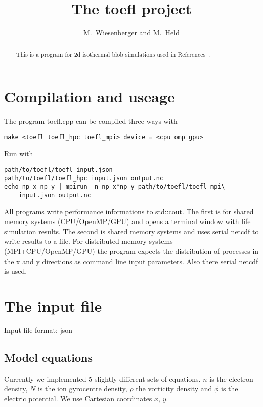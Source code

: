 


\usepackage{minted}
\renewcommand{\ne}{\ensuremath{{n_e} }}
\renewcommand{\ni}{\ensuremath{{N_i} }}



\title{The toefl project}
\author{ M.~Wiesenberger and M.~Held}
\maketitle

\begin{abstract}
  This is a program for 2d isothermal blob simulations used in References~\cite{Wiesenberger2014,Kube2016,Wiesenberger2017a}.
\end{abstract}
\tableofcontents

\section{Compilation and useage}
The program toefl.cpp can be compiled three ways with
\begin{verbatim}
make <toefl toefl_hpc toefl_mpi> device = <cpu omp gpu>
\end{verbatim}
Run with
\begin{verbatim}
path/to/toefl/toefl input.json
path/to/toefl/toefl_hpc input.json output.nc
echo np_x np_y | mpirun -n np_x*np_y path/to/toefl/toefl_mpi\
    input.json output.nc
\end{verbatim}
All programs write performance informations to std::cout.
The first is for shared memory systems (CPU/OpenMP/GPU) and opens a terminal window with life simulation results.
 The
second is shared memory systems and uses serial netcdf
to write results to a file.
For distributed
memory systems (MPI+CPU/OpenMP/GPU) the program expects the distribution of processes in the
x and y directions as command line input parameters. Also there serial netcdf is used.

\section{The input file}
Input file format: \href{https://en.wikipedia.org/wiki/JSON}{json}

\subsection{Model equations}
Currently we implemented $5$ slightly different sets of equations. $n$ is the electron density, $N$ is the ion gyrocentre density, $\rho$
the vorticity density and $\phi$ is the electric potential. We
use Cartesian coordinates $x$, $y$.

